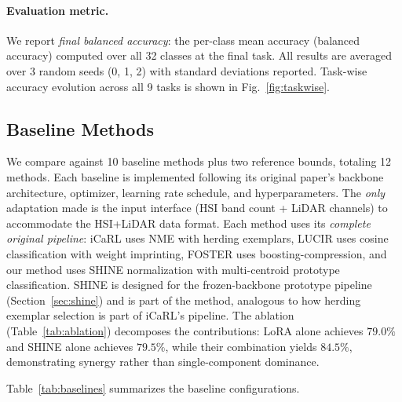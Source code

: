 \paragraph{Evaluation metric.}
We report \emph{final balanced accuracy}: the per-class mean accuracy (balanced accuracy) computed over all 32 classes at the final task.
All results are averaged over 3 random seeds (0, 1, 2) with standard deviations reported.
Task-wise accuracy evolution across all 9 tasks is shown in Fig.~\ref{fig:taskwise}.

\subsection{Baseline Methods}
\label{sec:baselines}

We compare against 10 baseline methods plus two reference bounds, totaling 12 methods.
Each baseline is implemented following its original paper's backbone architecture, optimizer, learning rate schedule, and hyperparameters.
The \emph{only} adaptation made is the input interface (HSI band count + LiDAR channels) to accommodate the HSI+LiDAR data format.
Each method uses its \emph{complete original pipeline}: iCaRL uses NME with herding exemplars, LUCIR uses cosine classification with weight imprinting, FOSTER uses boosting-compression, and our method uses SHINE normalization with multi-centroid prototype classification.
SHINE is designed for the frozen-backbone prototype pipeline (Section~\ref{sec:shine}) and is part of the \methodname{} method, analogous to how herding exemplar selection is part of iCaRL's pipeline.
The ablation (Table~\ref{tab:ablation}) decomposes the contributions: LoRA alone achieves $79.0\%$ and SHINE alone achieves $79.5\%$, while their combination yields $84.5\%$, demonstrating synergy rather than single-component dominance.

Table~\ref{tab:baselines} summarizes the baseline configurations.

